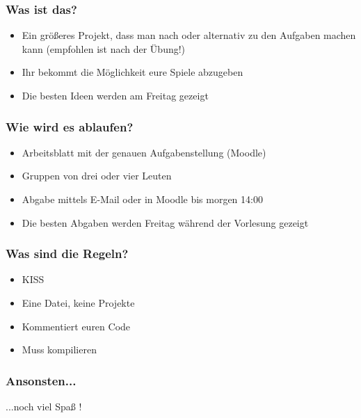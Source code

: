 \begin{frame}
	\frametitle{Was ist das?}
	\begin{itemize}
		\item Ein größeres Projekt, dass man nach oder alternativ zu den Aufgaben machen kann (empfohlen ist nach der Übung!)
		\item Ihr bekommt die Möglichkeit eure Spiele abzugeben
		\item Die besten Ideen werden am Freitag gezeigt
	\end{itemize}
\end{frame}

\begin{frame}
	\frametitle{Wie wird es ablaufen?}
	\begin{itemize}
		\item Arbeitsblatt mit der genauen Aufgabenstellung (Moodle)
		\item Gruppen von drei oder vier Leuten
		\item Abgabe mittels E-Mail oder in Moodle bis morgen 14:00
		\item Die besten Abgaben werden Freitag während der Vorlesung gezeigt
	\end{itemize}
\end{frame}

\begin{frame}
	\frametitle{Was sind die Regeln?}
	\begin{itemize}
		\item KISS
		\item Eine Datei, keine Projekte
		\item Kommentiert euren Code
		\item Muss kompilieren
	\end{itemize}
\end{frame}

\begin{frame}
	\frametitle{Ansonsten...}
	\vspace{15mm}
	\begin{center}
		\huge ...noch viel Spaß !
	\end{center}
\end{frame}
